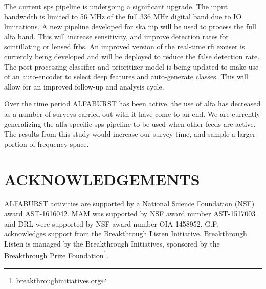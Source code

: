 \documentclass[a4paper,fleqn,usenatbib]{mnras}
\begin{document}
The current \gls{sps} pipeline is undergoing a significant upgrade. The input
bandwidth is limited to 56 MHz of the full 336 MHz digital band due to IO
limitations. A new pipeline developed for \gls{ska} \gls{nip} will be used to
process the full \gls{alfa} band.  This will increase sensitivity, and improve
detection rates for scintillating or lensed \glspl{frb}.  An improved version
of the real-time \gls{rfi} exciser is currently being developed and will be
deployed to reduce the false detection rate. The post-processing classifier and
prioritizer model is being updated to make use of an auto-encoder to select
deep features and auto-generate classes. This will allow for an improved
follow-up and analysis cycle.

Over the time period ALFABURST has been active, the use of \gls{alfa} has
decreased as a number of surveys carried out with it have come to an end. We
are currently generalizing the \gls{alfa} specific \gls{sps} pipeline to be
used when other feeds are active. The results from this study would increase
our survey time, and sample a larger portion of frequency space. 

\section*{ACKNOWLEDGEMENTS}

ALFABURST activities are supported by a National Science Foundation (NSF) award
AST-1616042.  MAM was supported by NSF award number AST-1517003  and DRL were
supported by NSF award number OIA-1458952.  G.F. acknowledges support from the
Breakthrough Listen Initiative. Breakthrough Listen is managed by the
Breakthrough Initiatives, sponsored by the Breakthrough Prize
Foundation\footnote{breakthroughinitiatives.org}.
 

 

\bsp	%
\label{lastpage}
\end{document}
